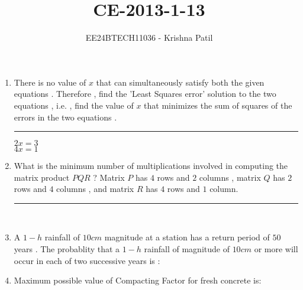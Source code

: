 \documentclass[journal]{IEEEtran}
\begin{document}

\vspace{3cm}

\title{CE-2013-1-13}
\author{EE24BTECH11036 - Krishna Patil}
{\let\newpage\relax\maketitle}
\begin{enumerate}
\item There is no value of $x$ that can simultaneously satisfy both the given equations . Therefore , find the 'Least Squares error' solution to the two equations , i.e. , find the value of $x$ that minimizes the sum of squares of the errors in the two equations . \rule{2cm}{0.4pt}
 \begin{center}
     $2x=3$ \\ $4x=1$ \\
 \end{center}
\item What is the minimum number of multiplications involved in computing the matrix product $PQR$ ? Matrix $P$ has $4$ rows and $2$ columns ,  matrix $Q$ has $2$ rows and $4$ columns , and matrix $R$ has $4$ rows and $1$ column. \rule{2cm}{0.4pt} \\
\item A $1-h$ rainfall of $10cm$ magnitude at a station has a return period of $50$ years . The probablity that a $1-h$ rainfall of magnitude of $10cm$  or more will occur in each of two successive years is :  
\begin{enumerate}
\end{enumerate}
\item Maximum possible value of Compacting Factor for fresh  concrete is:
\begin{enumerate}
\end{enumerate}
\end{enumerate}
\end{document}
